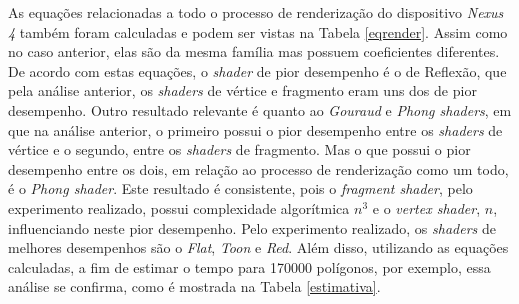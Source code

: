 	As equações relacionadas a todo o processo de renderização do dispositivo \textit{Nexus 4} também foram calculadas e podem ser vistas na Tabela \ref{eqrender}. Assim como no caso anterior, elas são da mesma família mas possuem coeficientes diferentes. De acordo com estas equações, o \textit{shader} de pior desempenho é o de Reflexão, que pela análise anterior, os \textit{shaders} de vértice e fragmento eram uns dos de pior desempenho. Outro resultado relevante é quanto ao \textit{Gouraud} e \textit{Phong shaders}, em que na análise anterior, o primeiro possui o pior desempenho entre os \textit{shaders} de vértice e o segundo, entre os \textit{shaders} de fragmento.  Mas o que possui o pior desempenho entre os dois, em relação ao processo de renderização como um todo, é o \textit{Phong shader}. Este resultado é consistente, pois o \textit{fragment shader}, pelo experimento realizado, possui complexidade algorítmica $n^3$ e o \textit{vertex shader}, $n$, influenciando neste pior desempenho. 	Pelo experimento realizado, os \textit{shaders} de melhores desempenhos são o \textit{Flat}, \textit{Toon} e \textit{Red}. Além disso, utilizando as equações calculadas, a fim de estimar o tempo para 170000 polígonos, por exemplo, essa análise se confirma, como é mostrada na Tabela \ref{estimativa}.

